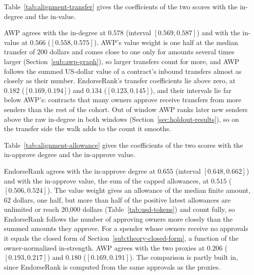
Table~\ref{tab:alignment-transfer} gives the coefficients of the two scores with the in-degree and the in-value.



AWP agrees with the in-degree at $0.578$ (interval $[0.569,0.587]$) and with the in-value at $0.566$ ($[0.558,0.575]$). AWP's value weight is one half at the median transfer of 200 dollars and comes close to one only for amounts several times larger (Section~\ref{sub:awp-graph}), so larger transfers count for more, and AWP follows the summed US-dollar value of a contract's inbound transfers almost as closely as their number. EndorseRank's transfer coefficients lie above zero, at $0.182$ ($[0.169,0.194]$) and $0.134$ ($[0.123,0.145]$), and their intervals lie far below AWP's: contracts that many owners approve receive transfers from more senders than the rest of the cohort. Out of window AWP ranks later new senders above the raw in-degree in both windows (Section~\ref{sec:holdout-results}), so on the transfer side the walk adds to the count it smooths.


Table~\ref{tab:alignment-allowance} gives the coefficients of the two scores with the in-approve degree and the in-approve value.



EndorseRank agrees with the in-approve degree at $0.655$ (interval $[0.648,0.662]$) and with the in-approve value, the sum of the capped allowances, at $0.515$ ($[0.506,0.524]$). The value weight gives an allowance of the median finite amount, 62 dollars, one half, but more than half of the positive latest allowances are unlimited or reach 20{,}000 dollars (Table~\ref{tab:usd-tokens}) and count fully, so EndorseRank follows the number of approving owners more closely than the summed amounts they approve. For a spender whose owners receive no approvals it equals the closed form of Section~\ref{sub:theory-closed-form}, a function of the owner-normalized in-strength. AWP agrees with the two proxies at $0.206$ ($[0.193,0.217]$) and $0.180$ ($[0.169,0.191]$). The comparison is partly built in, since EndorseRank is computed from the same approvals as the proxies.


